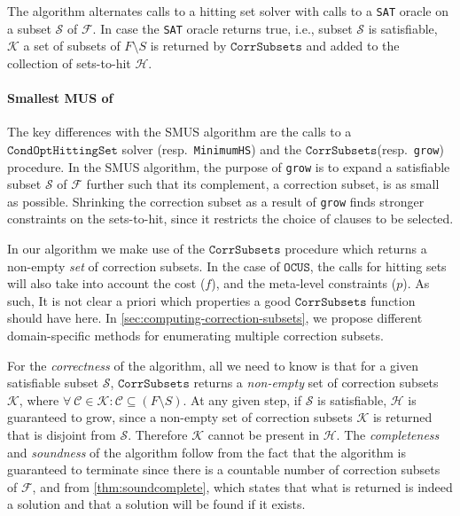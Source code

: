 \documentclass[twoside,11pt]{article}
\newcommand\citet[1]{\citeauthor{#1}~\citeyear{#1}}
\newcommand\m[1]{\mathcal{#1}}
\newcommand\setstohit{\ensuremath{\m{H} }\xspace}
\newcommand\formula{\ensuremath{\m{F} }\xspace}
\newcommand\mm[1]{\ensuremath{#1}\xspace}
\newcommand\call[1]{\mm{\texttt{#1}}}
\newcommand\cohs{\mm{\call{CondOptHittingSet}}}
\newcommand\sat{\texttt{{SAT}}\xspace}
\newcommand\comus{\mm{\call{OCUS}}}
\newcommand\corrsubsets{\mm{\call{CorrSubsets}}}
\begin{document}
The algorithm alternates calls to a hitting set solver with calls to a \sat oracle on a subset $\m{S}$ of $\formula$. 
In case the \sat oracle returns true, i.e., subset $\m{S}$ is satisfiable, $\m{K}$ a set of subsets of $F\setminus S$ is returned by \corrsubsets and added to the collection of sets-to-hit \setstohit. 

\paragraph{Smallest MUS of \citet{ignatiev2015smallest}}
The key differences with the SMUS algorithm are the calls to a \cohs solver (resp.~\texttt{MinimumHS}) and the \corrsubsets (resp.~\texttt{grow}) procedure.
In the SMUS algorithm, the purpose of \texttt{grow} is to expand a satisfiable subset $\m{S}$ of $\m{F}$ further such that its complement, a correction subset, is as small as possible.
Shrinking the correction subset as a result of \texttt{grow} finds stronger constraints on the sets-to-hit, since it restricts the choice of clauses to be selected. 

In our algorithm we make use of the \corrsubsets procedure which returns a non-empty \emph{set} of correction subsets. 
In the case of \comus, the calls for hitting sets will also take into account the cost ($f$), and the meta-level constraints ($p$).
As such, It is not clear a priori which properties a good \corrsubsets function should have here.
In \cref{sec:computing-correction-subsets}, we propose different domain-specific methods for enumerating multiple correction subsets. 

For the \emph{correctness} of the algorithm, all we need to know is that for a given satisfiable subset $\m{S}$, \corrsubsets returns a \emph{non-empty} set of correction subsets~$\m{K}$, where $\forall \ \m{C} \in \m{K} : \m{C} \subseteq (F \setminus S)$.
At any given step, if $\m{S}$ is satisfiable, $\setstohit$ is guaranteed to grow, since a non-empty set of correction subsets $\m{K}$ is returned that is disjoint from $\m{S}$. Therefore $\m{K}$ cannot be present in $\setstohit$. 
The \emph{completeness} and \emph{soundness} of the algorithm follow from the fact that the algorithm is guaranteed to terminate since there is a countable number of correction subsets of $\formula$, and from \cref{thm:soundcomplete}, which states that what is returned is indeed a solution and that a solution will be found if it exists.  
\end{document}
